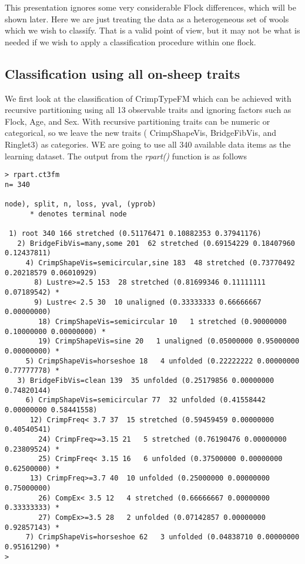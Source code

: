 \documentclass[titlepage]{article}  %
\begin{document}
This presentation ignores some very considerable Flock differences, which will be shown later. Here we are just treating the data as a heterogeneous set of wools which we wish to classify.  That is a valid point of view, but it may not be what is needed if we wish to apply a classification procedure within one flock.

\subsection{Classification using all on-sheep traits}
We first look at the classification of CrimpTypeFM which can be achieved  with recursive partitioning using all 13 observable traits and ignoring factors such as Flock, Age, and Sex. With recursive partitioning traits can be numeric or categorical, so we leave the new traits ( CrimpShapeVis, BridgeFibVis, and Ringlet3) as categories. WE are going to use all 340  available data items as the learning dataset. The output from the {\em rpart()} function is as follows
\begin{verbatim}
> rpart.ct3fm
n= 340 

node), split, n, loss, yval, (yprob)
      * denotes terminal node

 1) root 340 166 stretched (0.51176471 0.10882353 0.37941176)  
   2) BridgeFibVis=many,some 201  62 stretched (0.69154229 0.18407960 0.12437811)  
     4) CrimpShapeVis=semicircular,sine 183  48 stretched (0.73770492 0.20218579 0.06010929)  
       8) Lustre>=2.5 153  28 stretched (0.81699346 0.11111111 0.07189542) *
       9) Lustre< 2.5 30  10 unaligned (0.33333333 0.66666667 0.00000000)  
        18) CrimpShapeVis=semicircular 10   1 stretched (0.90000000 0.10000000 0.00000000) *
        19) CrimpShapeVis=sine 20   1 unaligned (0.05000000 0.95000000 0.00000000) *
     5) CrimpShapeVis=horseshoe 18   4 unfolded (0.22222222 0.00000000 0.77777778) *
   3) BridgeFibVis=clean 139  35 unfolded (0.25179856 0.00000000 0.74820144)  
     6) CrimpShapeVis=semicircular 77  32 unfolded (0.41558442 0.00000000 0.58441558)  
      12) CrimpFreq< 3.7 37  15 stretched (0.59459459 0.00000000 0.40540541)  
        24) CrimpFreq>=3.15 21   5 stretched (0.76190476 0.00000000 0.23809524) *
        25) CrimpFreq< 3.15 16   6 unfolded (0.37500000 0.00000000 0.62500000) *
      13) CrimpFreq>=3.7 40  10 unfolded (0.25000000 0.00000000 0.75000000)  
        26) CompEx< 3.5 12   4 stretched (0.66666667 0.00000000 0.33333333) *
        27) CompEx>=3.5 28   2 unfolded (0.07142857 0.00000000 0.92857143) *
     7) CrimpShapeVis=horseshoe 62   3 unfolded (0.04838710 0.00000000 0.95161290) *
> 
\end{verbatim}
\end{document}

